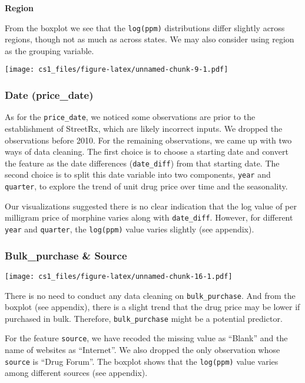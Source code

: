 \documentclass[
  11pt,
]{article}
\begin{document}
\textbf{Region}

From the boxplot we see that the \texttt{log(ppm)} distributions differ
slightly across regions, though not as much as across states. We may
also consider using region as the grouping variable.

\texttt{[image: cs1\_files/figure-latex/unnamed-chunk-9-1.pdf]}

\hypertarget{date-price_date}{%
\subsubsection{Date (price\_date)}\label{date-price_date}}

As for the \texttt{price\_date}, we noticed some observations are prior
to the establishment of StreetRx, which are likely incorrect inputs. We
dropped the observations before 2010. For the remaining observations, we
came up with two ways of data cleaning. The first choice is to choose a
starting date and convert the feature as the date differences
(\texttt{date\_diff}) from that starting date. The second choice is to
split this date variable into two components, \texttt{year} and
\texttt{quarter}, to explore the trend of unit drug price over time and
the seasonality.

Our visualizations suggested there is no clear indication that the log
value of per milligram price of morphine varies along with
\texttt{date\_diff}. However, for different \texttt{year} and
\texttt{quarter}, the \texttt{log(ppm)} value varies slightly (see
appendix).

\hypertarget{bulk_purchase-source}{%
\subsubsection{Bulk\_purchase \& Source}\label{bulk_purchase-source}}

\texttt{[image: cs1\_files/figure-latex/unnamed-chunk-16-1.pdf]}

There is no need to conduct any data cleaning on
\texttt{bulk\_purchase}. And from the boxplot (see appendix), there is a
slight trend that the drug price may be lower if purchased in bulk.
Therefore, \texttt{bulk\_purchase} might be a potential predictor.

For the feature \texttt{source}, we have recoded the missing value as
``Blank'' and the name of websites as ``Internet''. We also dropped the
only observation whose \texttt{source} is ``Drug Forum''. The boxplot
shows that the \texttt{log(ppm)} value varies among different sources
(see appendix).
\end{document}
